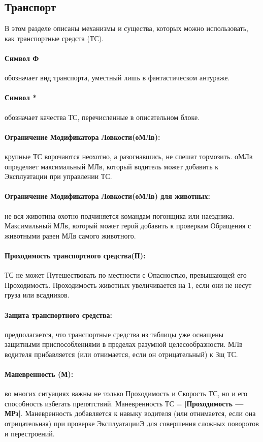 \subsection{Транспорт}
В этом разделе описаны механизмы и существа, которых можно использовать, как транспортные средста (ТС).
\paragraph{Символ Ф} обозначает вид транспорта, уместный лишь в фантастическом антураже.
\paragraph{Символ *} обозначает качества ТС, перечисленные в описательном блоке.
\paragraph{Ограничение Модификатора Ловкости(оМЛв):} крупные ТС ворочаются неохотно, а разогнавшись, не спешат тормозить. оМЛв определяет максимальный МЛв, который водитель может добавить к Эксплуатации при управлении ТС.
\paragraph{Ограничение Модификатора Ловкости(оМЛв) для животных:} не вся животина охотно подчиняется командам погонщика или наездника. Максимальный МЛв, который может герой добавить к проверкам Обращения с животными равен МЛв самого животного.
\paragraph{Проходимость транспортного средства(П):} ТС не может Путешествовать по местности с Опасностью, превышающей его Проходимость. 
\newline Проходимость животных увеличивается на 1, если они не несут груза или всадников.

\paragraph{Защита транспортного средства:} предполагается, что транспортные средства из таблицы уже оснащены защитными приспособлениями в пределах разумной целесообразности. 
\newline МЛв водителя прибавляется (или отнимается, если он отрицательный) к Зщ ТС.
\paragraph{Маневренность (М):} во многих ситуациях важны не только Проходимость и Скорость ТС, но и его способность избегать препятствий. Маневренность ТС = \textbf{|Проходимость — МРз|}. Маневренность добавляется к навыку водителя (или отнимается, если она отрицательная) при проверке ЭксплуатацииЭ для совершения сложных поворотов и перестроений.
